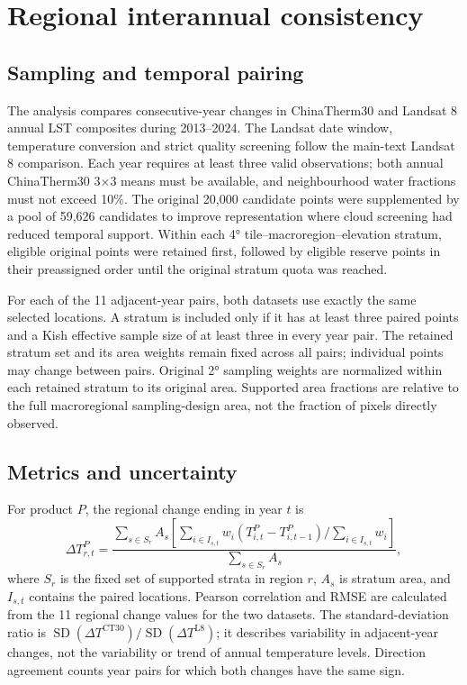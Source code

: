 \section*{Regional interannual consistency}

\subsection*{Sampling and temporal pairing}

The analysis compares consecutive-year changes in ChinaTherm30 and Landsat 8 annual LST composites during 2013--2024. The Landsat date window, temperature conversion and strict quality screening follow the main-text Landsat 8 comparison. Each year requires at least three valid observations; both annual ChinaTherm30 3$\times$3 means must be available, and neighbourhood water fractions must not exceed 10\%. The original 20,000 candidate points were supplemented by a pool of 59,626 candidates to improve representation where cloud screening had reduced temporal support. Within each 4° tile--macroregion--elevation stratum, eligible original points were retained first, followed by eligible reserve points in their preassigned order until the original stratum quota was reached.

For each of the 11 adjacent-year pairs, both datasets use exactly the same selected locations. A stratum is included only if it has at least three paired points and a Kish effective sample size of at least three in every year pair. The retained stratum set and its area weights remain fixed across all pairs; individual points may change between pairs. Original 2° sampling weights are normalized within each retained stratum to its original area. Supported area fractions are relative to the full macroregional sampling-design area, not the fraction of pixels directly observed.

\subsection*{Metrics and uncertainty}

For product $P$, the regional change ending in year $t$ is
\begin{equation}
\Delta T^P_{r,t}=\frac{\sum_{s\in S_r}A_s\left[\sum_{i\in I_{s,t}}w_i(T^P_{i,t}-T^P_{i,t-1})/\sum_{i\in I_{s,t}}w_i\right]}{\sum_{s\in S_r}A_s},
\end{equation}
where $S_r$ is the fixed set of supported strata in region $r$, $A_s$ is stratum area, and $I_{s,t}$ contains the paired locations. Pearson correlation and RMSE are calculated from the 11 regional change values for the two datasets. The standard-deviation ratio is $\operatorname{SD}(\Delta T^{\mathrm{CT30}})/\operatorname{SD}(\Delta T^{\mathrm{L8}})$; it describes variability in adjacent-year changes, not the variability or trend of annual temperature levels. Direction agreement counts year pairs for which both changes have the same sign.

